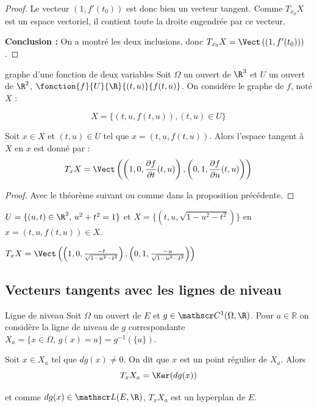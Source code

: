 \begin{proof}
    Le vecteur $(1, f'(t_0))$ est donc bien un vecteur tangent. Comme $T_{x_0}X$ est un espace vectoriel, il contient toute la droite engendrée par ce vecteur.
    
    \bigskip
    \noindent \textbf{Conclusion :} On a montré les deux inclusions, donc $T_{x_0}X = \Vect\left( (1, f'(t_0)) \right)$.
\end{proof}

\begin{propositionnt}{graphe d'une fonction de deux variables}{}
    Soit $\Omega$ un ouvert de $\R^3$ et $U$ un ouvert de $\R^2$, 
    $\fonction{f}{U}{\R}{(t, u)}{f(t, u)}$. On considère le graphe de $f$, 
    noté $X$ : 

    $$X = \{(t, u, f(t, u)), (t, u) \in U\}$$

    Soit $x \in X$ et $(t, u) \in U$ tel que $x = (t, u, f(t, u))$. Alors
    l'espace tangent à $X$ en $x$ est donné par :
    $$T_xX = \Vect\left( \left(1, 0, \frac{\partial f}{\partial t}(t, u)\right), \left(0, 1, \frac{\partial f}{\partial u}(t, u)\right) \right)$$
\end{propositionnt}

\begin{proof}
    Avec le théorème suivant ou comme dans la proposition précédente.
\end{proof}

\begin{exemple}
    $U = \{(u, t) \in \R^2, \, u^2 + t^2 = 1\}$ et $X = \{(t, u, \sqrt{1 - u^2 - t^2})\}$
    en $x = (t, u, f(t, u)) \in X$. 

    $T_xX = \Vect\left( \left(1, 0, \frac{-t}{\sqrt{1 - u^2 - t^2}}\right), \left(0, 1, \frac{-u}{\sqrt{1 - u^2 - t^2}}\right) \right)$
\end{exemple}

\subsection{Vecteurs tangents avec les lignes de niveau}

\begin{theoreme}{Ligne de niveau}{}
    Soit $\Omega$ un ouvert de $E$ et $g \in \mathscr C^1(\Omega, \R)$. 
    Pour $a \in \mathbb R$ on considère la ligne de niveau de $g$ correspondante 
    $X_a = \{x \in \Omega, \, g(x) = a \} = g^{-1}(\{a\})$.

    Soit $x \in X_a$ tel que $dg(x) \neq 0$. On dit que $x$ est un point régulier de 
    $X_a$. Alors 
    $$T_xX_a = \Ker (dg(x))$$

    et comme $dg(x) \in \mathscr L(E, \R)$, $T_xX_a$ est un hyperplan de $E$.
\end{theoreme}

